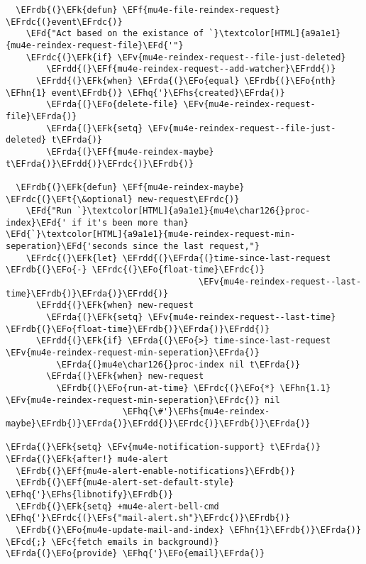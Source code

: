 \documentclass[a4wide,10pt]{article}
\newcommand{\EFc}[1]{\textcolor{EFc}{#1}} %
\newcommand{\EFcd}[1]{\textcolor{EFcd}{#1}} %
\newcommand{\EFs}[1]{\textcolor{EFs}{#1}} %
\newcommand{\EFd}[1]{\textcolor{EFd}{#1}} %
\newcommand{\EFk}[1]{\textcolor{EFk}{#1}} %
\newcommand{\EFf}[1]{\textcolor{EFf}{#1}} %
\newcommand{\EFv}[1]{\textcolor{EFv}{#1}} %
\newcommand{\EFt}[1]{\textcolor{EFt}{#1}} %
\newcommand{\EFo}[1]{\textcolor{EFo}{#1}} %
\newcommand{\EFhn}[1]{\textcolor{EFhn}{\textbf{#1}}} %
\newcommand{\EFhq}[1]{\textcolor{EFhq}{#1}} %
\newcommand{\EFhs}[1]{\textcolor{EFhs}{#1}} %
\newcommand{\EFrda}[1]{\textcolor{EFrda}{#1}} %
\newcommand{\EFrdb}[1]{\textcolor{EFrdb}{#1}} %
\newcommand{\EFrdc}[1]{\textcolor{EFrdc}{#1}} %
\newcommand{\EFrdd}[1]{\textcolor{EFrdd}{#1}} %
\begin{document}
\begin{Code}
\begin{Verbatim}
  \EFrdb{(}\EFk{defun} \EFf{mu4e-file-reindex-request} \EFrdc{(}event\EFrdc{)}
    \EFd{"Act based on the existance of `}\textcolor[HTML]{a9a1e1}{mu4e-reindex-request-file}\EFd{'"}
    \EFrdc{(}\EFk{if} \EFv{mu4e-reindex-request--file-just-deleted}
        \EFrdd{(}\EFf{mu4e-reindex-request--add-watcher}\EFrdd{)}
      \EFrdd{(}\EFk{when} \EFrda{(}\EFo{equal} \EFrdb{(}\EFo{nth} \EFhn{1} event\EFrdb{)} \EFhq{'}\EFhs{created}\EFrda{)}
        \EFrda{(}\EFo{delete-file} \EFv{mu4e-reindex-request-file}\EFrda{)}
        \EFrda{(}\EFk{setq} \EFv{mu4e-reindex-request--file-just-deleted} t\EFrda{)}
        \EFrda{(}\EFf{mu4e-reindex-maybe} t\EFrda{)}\EFrdd{)}\EFrdc{)}\EFrdb{)}

  \EFrdb{(}\EFk{defun} \EFf{mu4e-reindex-maybe} \EFrdc{(}\EFt{\&optional} new-request\EFrdc{)}
    \EFd{"Run `}\textcolor[HTML]{a9a1e1}{mu4e\char126{}proc-index}\EFd{' if it's been more than}
\EFd{`}\textcolor[HTML]{a9a1e1}{mu4e-reindex-request-min-seperation}\EFd{'seconds since the last request,"}
    \EFrdc{(}\EFk{let} \EFrdd{(}\EFrda{(}time-since-last-request \EFrdb{(}\EFo{-} \EFrdc{(}\EFo{float-time}\EFrdc{)}
                                      \EFv{mu4e-reindex-request--last-time}\EFrdb{)}\EFrda{)}\EFrdd{)}
      \EFrdd{(}\EFk{when} new-request
        \EFrda{(}\EFk{setq} \EFv{mu4e-reindex-request--last-time} \EFrdb{(}\EFo{float-time}\EFrdb{)}\EFrda{)}\EFrdd{)}
      \EFrdd{(}\EFk{if} \EFrda{(}\EFo{>} time-since-last-request \EFv{mu4e-reindex-request-min-seperation}\EFrda{)}
          \EFrda{(}mu4e\char126{}proc-index nil t\EFrda{)}
        \EFrda{(}\EFk{when} new-request
          \EFrdb{(}\EFo{run-at-time} \EFrdc{(}\EFo{*} \EFhn{1.1} \EFv{mu4e-reindex-request-min-seperation}\EFrdc{)} nil
                       \EFhq{\#'}\EFhs{mu4e-reindex-maybe}\EFrdb{)}\EFrda{)}\EFrdd{)}\EFrdc{)}\EFrdb{)}\EFrda{)}

\EFrda{(}\EFk{setq} \EFv{mu4e-notification-support} t\EFrda{)}
\EFrda{(}\EFk{after!} mu4e-alert
  \EFrdb{(}\EFf{mu4e-alert-enable-notifications}\EFrdb{)}
  \EFrdb{(}\EFf{mu4e-alert-set-default-style} \EFhq{'}\EFhs{libnotify}\EFrdb{)}
  \EFrdb{(}\EFk{setq} +mu4e-alert-bell-cmd \EFhq{'}\EFrdc{(}\EFs{"mail-alert.sh"}\EFrdc{)}\EFrdb{)}
  \EFrdb{(}\EFo{mu4e-update-mail-and-index} \EFhn{1}\EFrdb{)}\EFrda{)} \EFcd{;} \EFc{fetch emails in background)}
\EFrda{(}\EFo{provide} \EFhq{'}\EFo{email}\EFrda{)}
\end{Verbatim}
\end{Code}
\end{document}
